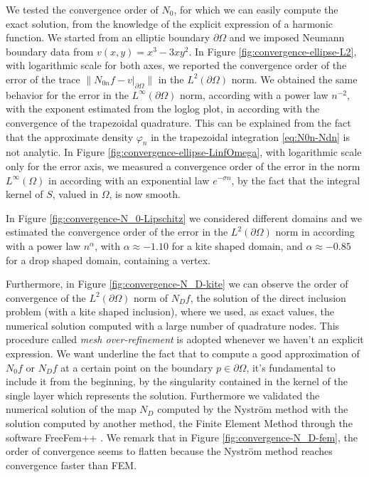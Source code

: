 \documentclass[10pt, a4paper, twoside, openright]{book}
\theoremstyle{definition}
\theoremstyle{plain}
\theoremstyle{plain}
\theoremstyle{plain}
\theoremstyle{plain}
\theoremstyle{plain}
\theoremstyle{plain}
\theoremstyle{plain}
\theoremstyle{plain}
\let\phi\varphi
\begin{document}
\par
We tested the convergence order of $N_0$, for which we can easily compute the exact solution, 
from the knowledge of the explicit expression of a harmonic function. 
We started from an elliptic boundary $\partial\Omega$ and we imposed Neumann boundary data from 
$v(x,y)=x^3 - 3 xy^2$.
In Figure \ref{fig:convergence-ellipse-L2}, with logarithmic scale for both axes,
we reported the convergence order of the error of the trace $\|N_{0n}f - v|_{\partial\Omega}\|$ in the $L^2(\partial\Omega)$ norm.
We obtained the same behavior for the error in the $L^\infty(\partial\Omega)$ norm, 
according with a power law $n^{-2}$, with the exponent estimated from the loglog plot, 
in according with the convergence of the trapezoidal quadrature.
This can be explained from the fact that the approximate density $\phi_n$ 
in the trapezoidal integration \eqref{eq:N0n-Ndn} is not analytic.
In Figure \ref{fig:convergence-ellipse-LinfOmega}, with logarithmic scale only for 
the error axis, we measured a convergence order of the error in the norm $L^\infty(\Omega)$
in according with an exponential law $e^{-\sigma n}$, by the fact that the integral kernel of $S$, valued in $\Omega$,
is now smooth.
\par
In Figure \ref{fig:convergence-N_0-Lipschitz} we considered 
different domains and we estimated the convergence order of the error
in the $L^2(\partial\Omega)$ norm in according with a power law $n^\alpha$, 
with $\alpha\approx-1.10$ for a kite shaped domain, and $\alpha\approx-0.85$ 
for a drop shaped domain, containing a vertex.
\par
Furthermore, in Figure \ref{fig:convergence-N_D-kite} we can observe the order of convergence of 
the $L^2(\partial \Omega)$ norm of $N_Df$, the solution of the direct inclusion problem (with a kite
shaped inclusion), where we used, as exact values, the numerical solution computed with 
a large number of quadrature nodes. This procedure called \emph{mesh over-refinement} is adopted whenever
we haven't an explicit expression. We want underline the fact that to compute a good
approximation of $N_0f$ or $N_Df$ at a certain point on the boundary $p\in\partial\Omega$, it's fundamental
to include it from the beginning, by the singularity contained in the kernel of the single layer 
which represents
the solution. Furthermore we validated the numerical solution of the map $N_D$
computed by the Nystr\"{o}m method with the solution computed by another method, the Finite Element
Method through the software FreeFem++ \cite{FreeFem}. We remark that in Figure \ref{fig:convergence-N_D-fem}, 
the order of convergence seems to flatten because the Nystr\"{o}m method reaches convergence faster
than FEM.
\end{document}
